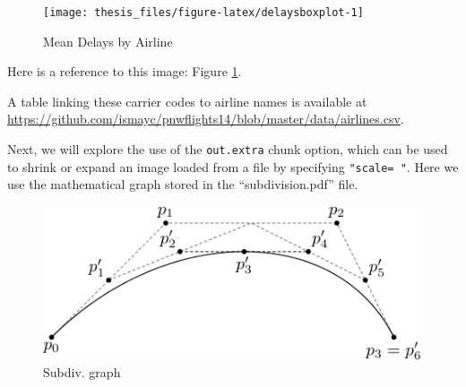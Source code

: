 \documentclass[12pt,twoside]{reedthesis}
\begin{document}
  \begin{Shaded}
  \end{Shaded}
  
  \begin{figure}
  
  {\centering \texttt{[image: thesis\_files/figure-latex/delaysboxplot-1]} 
  
  }
  
  \caption[Mean Delays by Airline]{Mean Delays by Airline}\label{fig:delaysboxplot}
  \end{figure}
  
  Here is a reference to this image: Figure \ref{fig:delaysboxplot}.
  
  A table linking these carrier codes to airline names is available at
  \url{https://github.com/ismayc/pnwflights14/blob/master/data/airlines.csv}.
  
  \clearpage
  
  Next, we will explore the use of the \texttt{out.extra} chunk option,
  which can be used to shrink or expand an image loaded from a file by
  specifying \texttt{"scale=\ "}. Here we use the mathematical graph
  stored in the ``subdivision.pdf'' file.
  
  \begin{figure}
  
  {\centering \includegraphics[scale=0.75]{figure/subdivision} 
  
  }
  
  \caption[Subdiv]{Subdiv. graph}\label{fig:subd}
  \end{figure}
  
\end{document}
